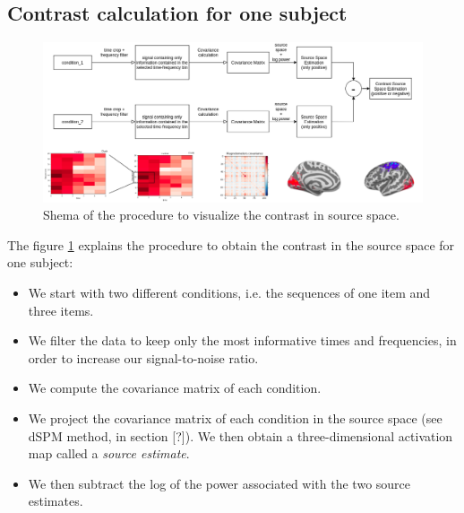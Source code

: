 

\subsection{Contrast calculation for one subject}
\begin{figure}[ht]
    \centering
    \includegraphics[width=15cm]{images_report/source/flow_source_contrasts.png}
    \caption[Shema of the procedure to visualize the contrast in source space.]%
    {Shema of the procedure to visualize the contrast in source space.}
    \label{flow_source_contrasts}
\end{figure}


The figure \ref{flow_source_contrasts} explains the procedure to obtain the contrast in the source space for one subject:
\begin{itemize}
    \item We start with two different conditions, i.e. the sequences of one item and three items.
    \item We filter the data to keep only the most informative times and frequencies, in order to increase our signal-to-noise ratio.
    \item We compute the covariance matrix of each condition.
    \item We project the covariance matrix of each condition in the source space (see dSPM method, in section [?]). We then obtain a three-dimensional activation map called a \textit{source estimate}.
    \item We then subtract the log of the power associated with the two source estimates.
\end{itemize}

